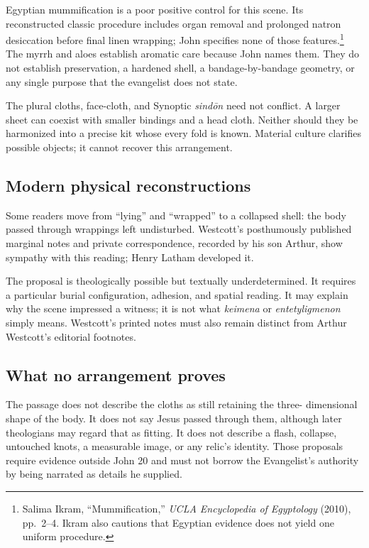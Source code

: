 Egyptian mummification is a poor positive control for this scene. Its
reconstructed classic procedure includes organ removal and prolonged natron
desiccation before final linen wrapping; John specifies none of those
features.\footnote{Salima Ikram, ``Mummification,'' \emph{UCLA Encyclopedia of
Egyptology} (2010), pp.~2--4. Ikram also cautions that Egyptian evidence does
not yield one uniform procedure.} The myrrh and aloes establish aromatic care
because John names them. They do not establish preservation, a hardened shell,
a bandage-by-bandage geometry, or any single purpose that the evangelist does
not state.

The plural cloths, face-cloth, and Synoptic \emph{sind\=on} need not conflict. A
larger sheet can coexist with smaller bindings and a head cloth. Neither should
they be harmonized into a precise kit whose every fold is known. Material
culture clarifies possible objects; it cannot recover this arrangement.

\subsection{Modern physical reconstructions}

Some readers move from ``lying'' and ``wrapped'' to a collapsed shell: the body
passed through wrappings left undisturbed. Westcott's posthumously published
marginal notes and private correspondence, recorded by his son Arthur, show
sympathy with this reading; Henry Latham developed it.

The proposal is theologically possible but textually underdetermined. It
requires a particular burial configuration, adhesion, and spatial reading.
It may explain why the scene impressed a witness; it is not what
\emph{keimena} or \emph{entetyligmenon} simply means. Westcott's printed notes
must also remain distinct from Arthur Westcott's editorial footnotes.

\subsection{What no arrangement proves}

The passage does not describe the cloths as still retaining the three-
dimensional shape of the body. It does not say Jesus passed through them,
although later theologians may regard that as fitting. It does not describe a
flash, collapse, untouched knots, a measurable image, or any relic's identity.
Those proposals require evidence outside John 20 and must not borrow the
Evangelist's authority by being narrated as details he supplied.

